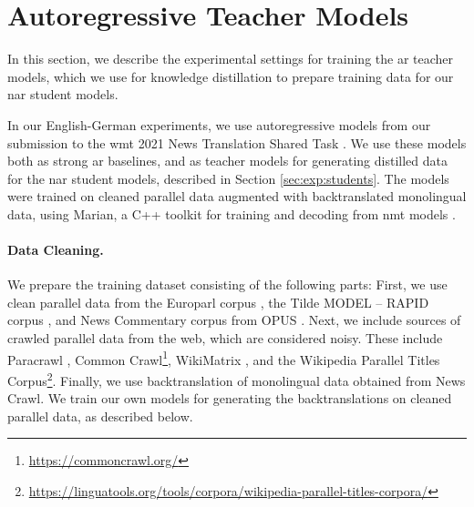 \section{Autoregressive Teacher Models}%
\label{sec:exp:teachers}


\noindent
In this section, we describe the experimental settings for training the \ac{ar}
teacher models, which we use for knowledge distillation to prepare training
data for our \ac{nar} student models.

In our English-German experiments, we use autoregressive models from our
submission to the \ac{wmt} 2021 News Translation Shared Task
\citep{chen-etal-2021-university}. We use these models both as strong \ac{ar}
baselines, and as teacher models for generating distilled data for the \ac{nar}
student models, described in Section \ref{sec:exp:students}. The models were
trained on cleaned parallel data augmented with backtranslated monolingual
data, using Marian, a C++ toolkit for training and decoding from \ac{nmt}
models \citep{junczys-dowmunt-etal-2018-marian}.

\paragraph{Data Cleaning.} We prepare the training dataset consisting of the
following parts: First, we use clean parallel data from the Europarl corpus
\citep{koehn-2005-europarl}, the Tilde MODEL -- RAPID corpus
\citep{rozis-skadins-2017-tilde}, and News Commentary corpus from OPUS
\citep{tiedemann-2012-parallel}. Next, we include sources of crawled parallel
data from the web, which are considered noisy. These include Paracrawl
\citep{espla-etal-2019-paracrawl}, Common
Crawl\footnote{\url{https://commoncrawl.org/}}, WikiMatrix
\citep{schwenk2019wikimatrix}, and the Wikipedia Parallel Titles
Corpus\footnote{\url{https://linguatools.org/tools/corpora/wikipedia-parallel-titles-corpora/}}. Finally,
we use backtranslation \citep{sennrich-etal-2016-improving} of monolingual data
obtained from News Crawl.  We train our own models for generating the
backtranslations on cleaned parallel data, as described below.

